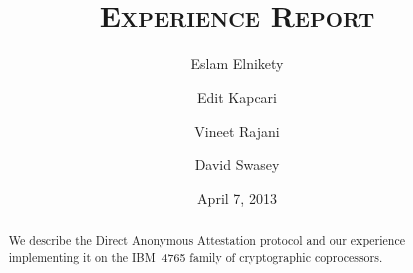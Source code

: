 \documentclass[a4paper]{article}
\title{\TITLE \\
	{\small\textsc{Experience Report}}%
}
\author{Eslam Elnikety \and Edit Kapcari \and Vineet Rajani \and David Swasey}
\date{April 7, 2013}
\begin{document}
\maketitle

\begin{abstract}
We describe the Direct Anonymous Attestation protocol
and our experience implementing it on the IBM~4765 family
of cryptographic coprocessors.
\end{abstract}






\appendix

\end{document}
